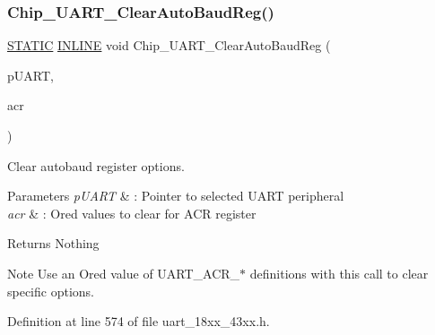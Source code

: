 \subsubsection{\texorpdfstring{Chip\+\_\+\+U\+A\+R\+T\+\_\+\+Clear\+Auto\+Baud\+Reg()}{Chip\_UART\_ClearAutoBaudReg()}}
{\footnotesize\ttfamily \hyperlink{group___l_p_c___types___public___macros_ga10b2d890d871e1489bb02b7e70d9bdfb}{S\+T\+A\+T\+IC} \hyperlink{spifi__18xx__43xx_8h_a2eb6f9e0395b47b8d5e3eeae4fe0c116}{I\+N\+L\+I\+NE} void Chip\+\_\+\+U\+A\+R\+T\+\_\+\+Clear\+Auto\+Baud\+Reg (\begin{DoxyParamCaption}\item[{\hyperlink{struct_l_p_c___u_s_a_r_t___t}{L\+P\+C\+\_\+\+U\+S\+A\+R\+T\+\_\+T} $\ast$}]{p\+U\+A\+RT,  }\item[{uint32\+\_\+t}]{acr }\end{DoxyParamCaption})}



Clear autobaud register options. 


\begin{DoxyParams}{Parameters}
{\em p\+U\+A\+RT} & \+: Pointer to selected U\+A\+RT peripheral \\
\hline
{\em acr} & \+: Or\textquotesingle{}ed values to clear for A\+CR register \\
\hline
\end{DoxyParams}
\begin{DoxyReturn}{Returns}
Nothing 
\end{DoxyReturn}
\begin{DoxyNote}{Note}
Use an Or\textquotesingle{}ed value of U\+A\+R\+T\+\_\+\+A\+C\+R\+\_\+$\ast$ definitions with this call to clear specific options. 
\end{DoxyNote}


Definition at line 574 of file uart\+\_\+18xx\+\_\+43xx.\+h.

\mbox{\label{group___u_a_r_t__18_x_x__43_x_x_gabdcefa8f847cfa0de2f9292405827874}} 
